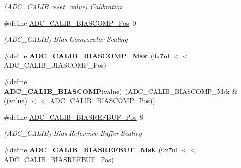 \begin{DoxyCompactItemize}
\begin{DoxyCompactList}\small\item\em (A\+D\+C\+\_\+\+C\+A\+L\+I\+B reset\+\_\+value) Calibration \end{DoxyCompactList}\item 
\hypertarget{group___s_a_m_l21___a_d_c_ga4d553dddf257f8d08957fe6f01e3669c}{}\#define \hyperlink{group___s_a_m_l21___a_d_c_ga4d553dddf257f8d08957fe6f01e3669c}{A\+D\+C\+\_\+\+C\+A\+L\+I\+B\+\_\+\+B\+I\+A\+S\+C\+O\+M\+P\+\_\+\+Pos}~0\label{group___s_a_m_l21___a_d_c_ga4d553dddf257f8d08957fe6f01e3669c}

\begin{DoxyCompactList}\small\item\em (A\+D\+C\+\_\+\+C\+A\+L\+I\+B) Bias Comparator Scaling \end{DoxyCompactList}\item 
\hypertarget{group___s_a_m_l21___a_d_c_ga35b3907028eb36abe446be1b0983165b}{}\#define {\bfseries A\+D\+C\+\_\+\+C\+A\+L\+I\+B\+\_\+\+B\+I\+A\+S\+C\+O\+M\+P\+\_\+\+Msk}~(0x7ul $<$$<$ A\+D\+C\+\_\+\+C\+A\+L\+I\+B\+\_\+\+B\+I\+A\+S\+C\+O\+M\+P\+\_\+\+Pos)\label{group___s_a_m_l21___a_d_c_ga35b3907028eb36abe446be1b0983165b}

\item 
\hypertarget{group___s_a_m_l21___a_d_c_ga9141fc1b463a3a99347592f0fccbd7fe}{}\#define {\bfseries A\+D\+C\+\_\+\+C\+A\+L\+I\+B\+\_\+\+B\+I\+A\+S\+C\+O\+M\+P}(value)~(A\+D\+C\+\_\+\+C\+A\+L\+I\+B\+\_\+\+B\+I\+A\+S\+C\+O\+M\+P\+\_\+\+Msk \& ((value) $<$$<$ \hyperlink{group___s_a_m_l21___a_d_c_ga4d553dddf257f8d08957fe6f01e3669c}{A\+D\+C\+\_\+\+C\+A\+L\+I\+B\+\_\+\+B\+I\+A\+S\+C\+O\+M\+P\+\_\+\+Pos}))\label{group___s_a_m_l21___a_d_c_ga9141fc1b463a3a99347592f0fccbd7fe}

\item 
\hypertarget{group___s_a_m_l21___a_d_c_ga29eeca0ab642341d2cd5cebb287f47d0}{}\#define \hyperlink{group___s_a_m_l21___a_d_c_ga29eeca0ab642341d2cd5cebb287f47d0}{A\+D\+C\+\_\+\+C\+A\+L\+I\+B\+\_\+\+B\+I\+A\+S\+R\+E\+F\+B\+U\+F\+\_\+\+Pos}~8\label{group___s_a_m_l21___a_d_c_ga29eeca0ab642341d2cd5cebb287f47d0}

\begin{DoxyCompactList}\small\item\em (A\+D\+C\+\_\+\+C\+A\+L\+I\+B) Bias Reference Buffer Scaling \end{DoxyCompactList}\item 
\hypertarget{group___s_a_m_l21___a_d_c_ga41776234bf9751f8baeecab3de589a8f}{}\#define {\bfseries A\+D\+C\+\_\+\+C\+A\+L\+I\+B\+\_\+\+B\+I\+A\+S\+R\+E\+F\+B\+U\+F\+\_\+\+Msk}~(0x7ul $<$$<$ A\+D\+C\+\_\+\+C\+A\+L\+I\+B\+\_\+\+B\+I\+A\+S\+R\+E\+F\+B\+U\+F\+\_\+\+Pos)\label{group___s_a_m_l21___a_d_c_ga41776234bf9751f8baeecab3de589a8f}


\end{DoxyCompactItemize}
